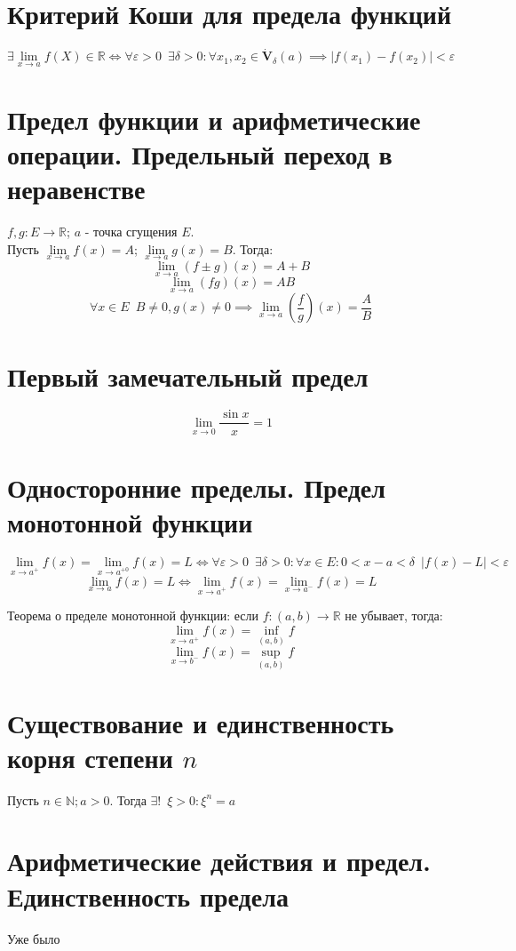\documentclass[11pt, a4paper]{article}
\def\R{\mathbb{R}}
\def\N{\mathbb{N}}
\def\sp{\, \, \,}
\def\lima{\lim \limits_{x \to a}}
\begin{document}
    \section{Критерий Коши для предела функций}
    $$\exists \lima f(X) \in \R \iff \forall \varepsilon > 0 \sp \exists \delta > 0: \forall x_1, x_2 \in \dot{\mathbf{V}}_{\delta}(a) \implies |f(x_1) - f(x_2)| < \varepsilon$$

    \section{Предел функции и арифметические операции. Предельный переход в неравенстве}
    $f,g : E \to \R$; $a$ - точка сгущения $E$.\\
    Пусть $\lima f(x) = A$; $\lima g(x) = B$. Тогда:
    $$\lima (f \pm g)(x) = A+B$$
    $$\lima (fg)(x) = AB$$
    $$\forall x \in E \sp B \neq 0, g(x) \neq 0 \implies \lima \left(\frac{f}{g}\right)(x) = \frac{A}{B}$$

    \section{Первый замечательный предел}
    $$\lim_{x \to 0} \frac{\sin x}{x} = 1$$

    \section{Односторонние пределы. Предел монотонной функции}
    $$\lim_{x \to a^+} f(x)= \lim_{x \to a^{+ 0}} f(x) = L \iff \forall \varepsilon > 0 \sp \exists \delta > 0 : \forall x \in E : 0 < x-a < \delta \sp |f(x) - L| < \varepsilon$$
    $$\lima f(x) = L \iff \lim_{x \to a^+} f(x) = \lim_{x \to a^-} f(x) = L$$

    Теорема о пределе монотонной функции: если $f : (a,b) \to \R$ не убывает, тогда:
    $$\lim_{x \to a^+} f(x) = \inf \limits_{(a,b)} f$$
    $$\lim_{x \to b^-} f(x) = \sup \limits_{(a,b)} f$$

    \section{Существование и единственность корня степени $n$}
    Пусть $n \in \N; a > 0$. Тогда $\exists ! \sp \xi > 0 : \xi ^n = a$

    \section{Арифметические действия и предел. Единственность предела}
    Уже было
\end{document}
